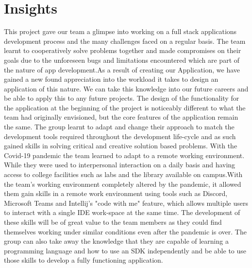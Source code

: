 \section{Insights}
This project gave our team a glimpse into working on a full stack applications development process and the many challenges faced on a regular basis. The team learnt to  cooperatively solve problems together and made compromises on their goals due to the unforeseen bugs and limitations encountered which are part of the nature of app development.As a result of creating our Application, we have gained a new found appreciation into the workload it takes to design an application of this nature.
\newline
\newline
We can take this knowledge into our future careers and be able to apply this to any future projects. The design of the functionality for the application at the beginning of the project is noticeably different to what the team had originally envisioned, but the core features of the application remain the same. The group learnt to adapt and change their approach to match the development tools required throughout the development life-cycle and as such gained skills in solving critical and creative solution based problems.
\newline
\newline
With the Covid-19 pandemic the team learned to adapt to a remote working environment. While they were used to interpersonal interaction on a daily basis and having access to college facilities such as labs and the library available on campus.\newline \newline With the team's working environment completely altered by the pandemic, it allowed them gain skills in a remote work environment using tools such as Discord, Microsoft Teams and Intellij's "code with me" feature\cite{ref19}, which allows multiple users to interact with a single IDE work-space at the same time. The development of these skills will be of great value to the team members as they could find themselves working under similar conditions even after the pandemic is over.
\newline
\newline
The group can also take away the knowledge that they are capable of learning a programming language and how to use an SDK independently and be able to use those skills to develop a fully functioning application.
